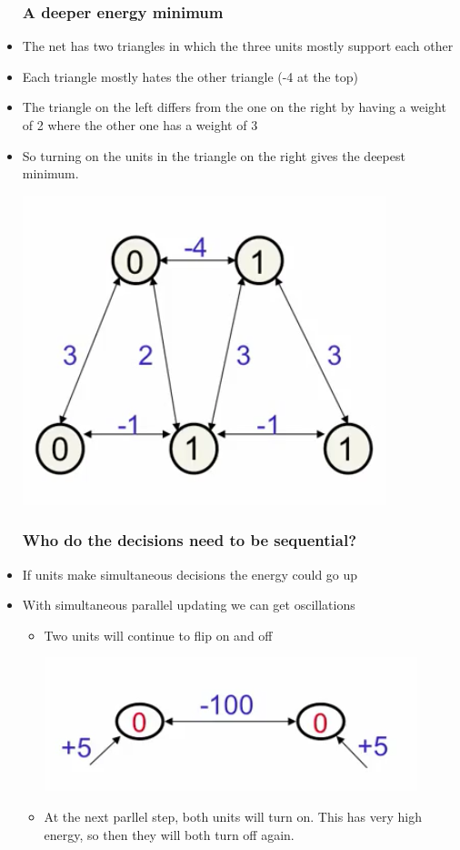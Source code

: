 \begin{itemize}
	\subsubsection{A deeper energy minimum}
	\item The net has two triangles in which the three units mostly support each other
	\item Each triangle mostly hates the other triangle (-4 at the top)
	\item The triangle on the left differs from the one on the right by having a weight of 2 where the other one has a weight of 3
	\item So turning on the units in the triangle on the right gives the deepest minimum.
	\begin{center}
		\includegraphics[scale=0.8]{sections/11/deep.png}
	\end{center}

	\subsubsection{Who do the decisions need to be sequential?}
	\item If units make simultaneous decisions the energy could go up
	\item With simultaneous parallel updating we can get oscillations
	\begin{itemize}
		\item Two units will continue to flip on and off
		\begin{center}
			\includegraphics[scale=0.9]{sections/11/osc.png}
		\end{center}
		\item At the next parllel step, both units will turn on. This has very high energy, so then they will both turn off again.
	\end{itemize}


\end{itemize}
